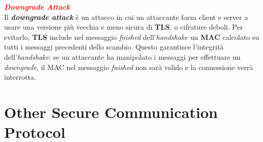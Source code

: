 \begin{flushleft}
    \medskip

    \textcolor{red}{\textbf{\textit{Downgrade Attack}}} \\
    Il \textbf{\textit{downgrade attack}} è un attacco in cui un attaccante forza client e server a usare una versione più vecchia e meno sicura di \textbf{TLS}, o cifrature deboli. Per evitarlo, \textbf{TLS} include nel messaggio \textit{fnished} dell'\textit{handshake} un \textbf{MAC} calcolato su tutti i messaggi precedenti dello scambio. Questo garantisce l'integrità dell'\textit{handshake}: se un attaccante ha manipolato i messaggi per effettuare un \textit{downgrade}, il MAC nel messaggio \textit{fnished} non sarà valido e la connessione verrà interrotta.
\end{flushleft}

\section{Other Secure Communication Protocol}


